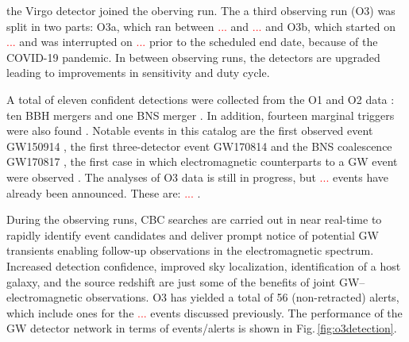 \documentclass[binding=0.6cm, LaM]{sapthesis}
\newcommand{\fpg}[1]{\textcolor{red}{#1} }
\begin{document}
the Virgo detector joined the oberving run.  The a third observing run (O3) was split in two parts: O3a, which ran between \fpg{...} and \fpg{...} and O3b, which started on \fpg{...} and was interrupted on \fpg{...} prior to the scheduled end date, because of the COVID-19 pandemic.  In between observing runs, the detectors are upgraded leading to improvements in sensitivity and duty cycle.

	A total of eleven confident detections were collected from the O1 and O2 data \cite{13}: 
	ten BBH mergers \cite{14, 52, 58-60} and one BNS merger \cite{61}.  In addition, fourteen marginal triggers were also found \cite{13}.
	Notable events in this catalog are the first observed event GW150914 \cite{52},
	the first three-detector event GW170814 \cite{60} and the BNS
	coalescence GW170817 \cite{61}, the first case in which electromagnetic counterparts to a GW event 
	were observed \cite{15}.
        The analyses of O3 data is still in progress, but \fpg{...} events have already been announced.  These are: \fpg{...}.

	During the observing runs, CBC searches are carried out in near real-time 
	to rapidly identify event candidates and deliver prompt notice of potential GW transients 
	enabling follow-up observations in the electromagnetic spectrum. 
	Increased detection confidence, improved sky localization, identification of a host galaxy, 
	and the source redshift are just some of the benefits of joint GW–electromagnetic observations.  O3 has yielded a total of 56 (non-retracted) alerts, which include ones for the \fpg{...} events discussed previously.  The performance of the GW detector network in terms of events/alerts is shown in Fig.\,\ref{fig:o3detection}. 
\end{document}
